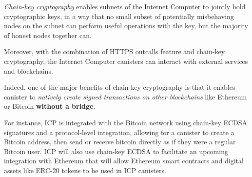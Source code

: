 \textit{Chain-key cryptography} enables subnets of the Internet Computer to jointly hold cryptographic keys, in a way that no small subset of potentially misbehaving nodes on the subnet can perform useful operations with the key, but the majority of honest nodes together can. \cite{icp-chain-key}

Moreover, with the combination of HTTPS outcalls feature and chain-key cryptography, the Internet Computer canisters can interact with external services and blockchains. \cite{icp-https-outcalls}

Indeed, one of the major benefits of chain-key cryptography is that it enables canister to \textit{natively create signed transactions on other blockchains} like Ethereum or Bitcoin \textbf{without a bridge}. \cite{icp-cross-chain-interoperability} 

For instance, ICP is integrated with the Bitcoin network using chain-key ECDSA signatures and a protocol-level integration, allowing for a canister to create a Bitcoin address, then send or receive bitcoin directly as if they were a regular Bitcoin user. ICP will also use chain-key ECDSA to facilitate an upcoming integration with Ethereum that will allow Ethereum smart contracts and digital assets like ERC-20 tokens to be used in ICP canisters. \cite{icp-cross-chain-interoperability}

